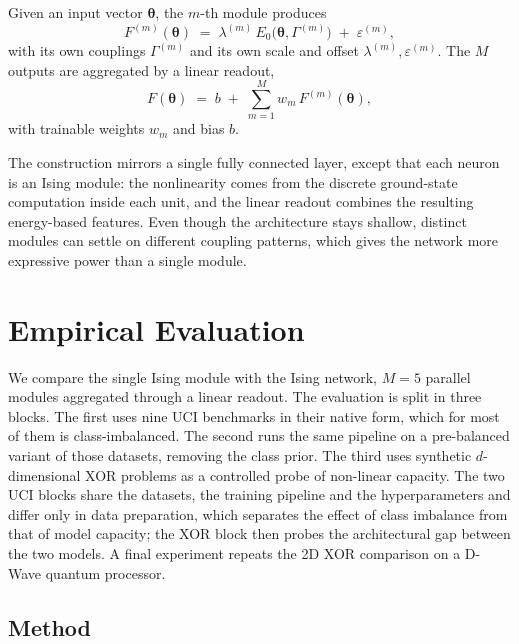 \documentclass{ieeeaccess}
\begin{document}
Given an input vector $\boldsymbol{\theta}$, the $m$-th module produces
\begin{equation}
F^{(m)}(\boldsymbol{\theta}) \;=\; \lambda^{(m)} \, E_0\!\big(\boldsymbol{\theta}, \Gamma^{(m)}\big) \;+\; \varepsilon^{(m)},
\label{eq:fullising_out}
\end{equation}
with its own couplings $\Gamma^{(m)}$ and its own scale and offset
$\lambda^{(m)}, \varepsilon^{(m)}$. The $M$ outputs are aggregated by a linear
readout,
\begin{equation}
F(\boldsymbol{\theta}) \;=\; b \;+\; \sum_{m=1}^{M} w_m \, F^{(m)}(\boldsymbol{\theta}),
\label{eq:linear_comb_fullising}
\end{equation}
with trainable weights $w_m$ and bias $b$.

The construction mirrors a single fully connected layer, except that each
neuron is an Ising module: the nonlinearity comes from the discrete
ground-state computation inside each unit, and the linear readout combines the
resulting energy-based features. Even though the architecture stays shallow,
distinct modules can settle on different coupling patterns, which gives the
network more expressive power than a single module.

\section{Empirical Evaluation}\label{sec:empirical}

We compare the single Ising module with the Ising network, $M=5$ parallel
modules aggregated through a linear readout. The evaluation is split in three
blocks. The first uses nine UCI benchmarks in their native form, which for
most of them is class-imbalanced. The second runs the same pipeline on a
pre-balanced variant of those datasets, removing the class prior. The third
uses synthetic $d$-dimensional XOR problems as a controlled probe of
non-linear capacity. The two UCI blocks share the datasets, the training
pipeline and the hyperparameters and differ only in data preparation, which
separates the effect of class imbalance from that of model capacity; the XOR
block then probes the architectural gap between the two models. A final
experiment repeats the 2D XOR comparison on a D-Wave quantum processor.

\subsection{Method}\label{sec:method}
\end{document}
